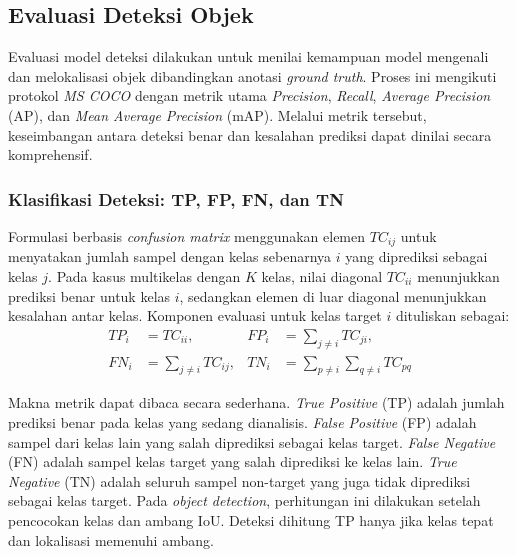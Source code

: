 \subsection{Evaluasi Deteksi Objek}

Evaluasi model deteksi dilakukan untuk menilai kemampuan model mengenali dan
melokalisasi objek dibandingkan anotasi \textit{ground truth}. Proses ini
mengikuti protokol \textit{MS COCO} \cite{lin2014microsoft} dengan metrik
utama \textit{Precision}, \textit{Recall}, \textit{Average Precision} (AP),
dan \textit{Mean Average Precision} (mAP). Melalui metrik tersebut,
keseimbangan antara deteksi benar dan kesalahan prediksi dapat dinilai secara
komprehensif.

\subsubsection{Klasifikasi Deteksi: TP, FP, FN, dan TN}

Formulasi berbasis \textit{confusion matrix} menggunakan elemen $TC_{ij}$
untuk menyatakan jumlah sampel dengan kelas sebenarnya $i$ yang diprediksi
sebagai kelas $j$. Pada kasus multikelas dengan $K$ kelas, nilai diagonal
$TC_{ii}$ menunjukkan prediksi benar untuk kelas $i$, sedangkan elemen di luar
diagonal menunjukkan kesalahan antar kelas. Komponen evaluasi untuk kelas
target $i$ dituliskan sebagai:
\begin{equation}
\begin{aligned}
TP_i &= TC_{ii}, & FP_i &= \sum_{j \neq i} TC_{ji}, \\
FN_i &= \sum_{j \neq i} TC_{ij}, & TN_i &= \sum_{p \neq i} \sum_{q \neq i} TC_{pq}
\end{aligned}
\end{equation}

Makna metrik dapat dibaca secara sederhana. \textit{True Positive} (TP) adalah
jumlah prediksi benar pada kelas yang sedang dianalisis. \textit{False
Positive} (FP) adalah sampel dari kelas lain yang salah diprediksi sebagai
kelas target. \textit{False Negative} (FN) adalah sampel kelas target yang
salah diprediksi ke kelas lain. \textit{True Negative} (TN) adalah seluruh
sampel non-target yang juga tidak diprediksi sebagai kelas target. Pada
\textit{object detection}, perhitungan ini dilakukan setelah pencocokan kelas
dan ambang IoU. Deteksi dihitung TP hanya jika kelas tepat dan lokalisasi
memenuhi ambang.

